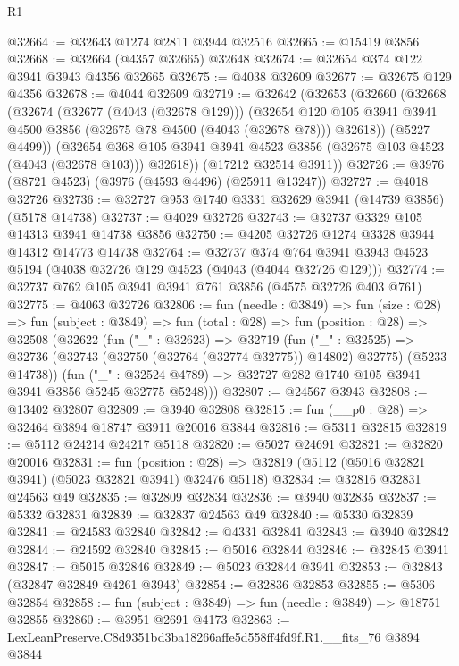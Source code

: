 \begin{lexlean}{R1}
\begin{coremodule}
@32664 := @32643 @1274 @2811 @3944 @32516
@32665 := @15419 @3856
@32668 := @32664 (@4357 @32665) @32648
@32674 := @32654 @374 @122 @3941 @3943 @4356 @32665
@32675 := @4038 @32609
@32677 := @32675 @129 @4356
@32678 := @4044 @32609
@32719 := @32642
    (@32653
      (@32660
        (@32668
          (@32674
            (@32677 (@4043 (@32678 @129)))
            (@32654
              @120
              @105
              @3941
              @3941
              @4500
              @3856
              (@32675 @78 @4500 (@4043 (@32678 @78)))
              @32618))
          (@5227 @4499))
        (@32654 @368 @105 @3941 @3941 @4523 @3856 (@32675 @103 @4523 (@4043 (@32678 @103))) @32618))
      (@17212 @32514 @3911))
@32726 := @3976 (@8721 @4523) (@3976 (@4593 @4496) (@25911 @13247))
@32727 := @4018 @32726
@32736 := @32727 @953 @1740 @3331 @32629 @3941 (@14739 @3856) (@5178 @14738)
@32737 := @4029 @32726
@32743 := @32737 @3329 @105 @14313 @3941 @14738 @3856
@32750 := @4205 @32726 @1274 @3328 @3944 @14312 @14773 @14738
@32764 := @32737
    @374
    @764
    @3941
    @3943
    @4523
    @5194
    (@4038 @32726 @129 @4523 (@4043 (@4044 @32726 @129)))
@32774 := @32737 @762 @105 @3941 @3941 @761 @3856 (@4575 @32726 @403 @761)
@32775 := @4063 @32726
@32806 := fun (needle : @3849) =>
  fun (size : @28) =>
  fun (subject : @3849) =>
  fun (total : @28) =>
  fun (position : @28) =>
  @32508
    (@32622
      (fun ("_" : @32623) =>
      @32719
        (fun ("_" : @32525) =>
        @32736 (@32743 (@32750 (@32764 (@32774 @32775)) @14802) @32775) (@5233 @14738))
        (fun ("_" : @32524 @4789) => @32727 @282 @1740 @105 @3941 @3941 @3856 @5245 @32775 @5248)))
@32807 := @24567 @3943
@32808 := @13402 @32807
@32809 := @3940 @32808
@32815 := fun (__p0 : @28) => @32464 @3894 @18747 @3911 @20016 @3844
@32816 := @5311 @32815
@32819 := @5112 @24214 @24217 @5118
@32820 := @5027 @24691
@32821 := @32820 @20016
@32831 := fun (position : @28) =>
  @32819 (@5112 (@5016 @32821 @3941) (@5023 @32821 @3941) @32476 @5118)
@32834 := @32816 @32831 @24563 @49
@32835 := @32809 @32834
@32836 := @3940 @32835
@32837 := @5332 @32831
@32839 := @32837 @24563 @49
@32840 := @5330 @32839
@32841 := @24583 @32840
@32842 := @4331 @32841
@32843 := @3940 @32842
@32844 := @24592 @32840
@32845 := @5016 @32844
@32846 := @32845 @3941
@32847 := @5015 @32846
@32849 := @5023 @32844 @3941
@32853 := @32843 (@32847 @32849 @4261 @3943)
@32854 := @32836 @32853
@32855 := @5306 @32854
@32858 := fun (subject : @3849) => fun (needle : @3849) => @18751 @32855
@32860 := @3951 @2691 @4173
@32863 := LexLeanPreserve.C8d9351bd3ba18266affe5d558ff4fd9f.R1.__fits_76 @3894 @3844

\end{coremodule}
\end{lexlean}
